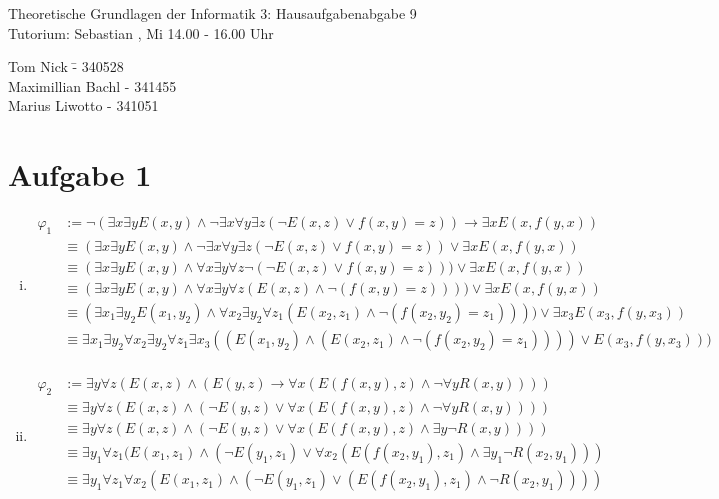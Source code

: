 \documentclass[a4paper,10pt]{article}
\begin{document}
\begin{center}
\Large{Theoretische Grundlagen der Informatik 3: Hausaufgabenabgabe 9} \\
\large{Tutorium: Sebastian , Mi 14.00 - 16.00 Uhr}
\end{center}
\begin{tabbing}
Tom Nick \hspace{2cm}\= - 340528\\
Maximillian Bachl \> - 341455 \\
Marius Liwotto\> -  341051
\end{tabbing}
\section*{Aufgabe 1}
\begin{enumerate}[(i)]
	\item 
		\begin{align*}
			\varphi_1 &:= \lnot (\exists x \exists y E(x,y) \land \lnot \exists x \forall y \exists z (\lnot E(x,z) \lor f(x,y) = z)) \rightarrow \exists x E(x,f(y,x)) \\
			&\equiv  (\exists x \exists y E(x,y) \land \lnot \exists x \forall y \exists z (\lnot E(x,z) \lor f(x,y) = z)) \lor \exists x E(x,f(y,x)) \\
			&\equiv  (\exists x \exists y E(x,y) \land \forall x \exists y \forall z \lnot(\lnot E(x,z) \lor f(x,y) = z))) \lor \exists x E(x,f(y,x)) \\
			&\equiv  (\exists x \exists y E(x,y) \land \forall x \exists y \forall z (E(x,z) \land \lnot(f(x,y) = z)))) \lor \exists x E(x,f(y,x)) \\
			&\equiv  (\exists x_1 \exists y_2 E(x_1,y_2) \land \forall x_2 \exists y_2 \forall z_1 (E(x_2,z_1) \land \lnot(f(x_2,y_2) = z_1)))) \lor \exists x_3 E(x_3,f(y,x_3)) \\
			&\equiv  \exists x_1 \exists y_2\forall x_2 \exists y_2 \forall z_1\exists x_3((E(x_1,y_2) \land   (E(x_2,z_1) \land \lnot(f(x_2,y_2) = z_1)))) \lor E(x_3,f(y,x_3)))  \\
		\end{align*}
	\item 
		\begin{align*}
			\varphi_2 &:= \exists y \forall z (E(x,z) \land (E(y,z) \rightarrow \forall x(E(f(x,y),z)\land \lnot \forall  y R(x,y) ))) \\
			&\equiv \exists y \forall z (E(x,z) \land (\lnot E(y,z) \lor\forall x(E(f(x,y),z)\land \lnot \forall  y R(x,y) ))) \\
			&\equiv \exists y \forall z (E(x,z) \land (\lnot E(y,z) \lor\forall x(E(f(x,y),z)\land \exists y \lnot R(x,y) ))) \\
			&\equiv \exists y_1 \forall z_1 (E(x_1,z_1) \land (\lnot E(y_1,z_1) \lor \forall x_2 (E(f(x_2,y_1),z_1)\land \exists y_1 \lnot R(x_2,y_1) )) \\
			&\equiv \exists y_1 \forall z_1 \forall x_2 (E(x_1,z_1) \land (\lnot E(y_1,z_1) \lor  (E(f(x_2,y_1),z_1)\land \lnot R(x_2,y_1) ))) \\
		\end{align*}
\end{enumerate}
\end{document}
